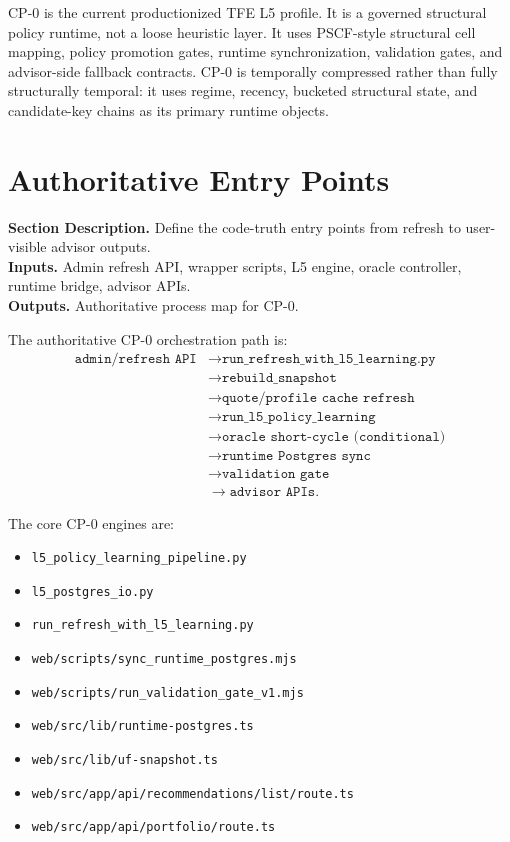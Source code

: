 \documentclass[11pt]{report}
\newcommand{\meta}[3]{\textbf{Section Description.} #1\\
\textbf{Inputs.} #2\\
\textbf{Outputs.} #3\par}
\begin{document}
CP-0 is the current productionized TFE L5 profile. It is a governed structural policy runtime, not a loose heuristic layer. It uses PSCF-style structural cell mapping, policy promotion gates, runtime synchronization, validation gates, and advisor-side fallback contracts. CP-0 is temporally compressed rather than fully structurally temporal: it uses regime, recency, bucketed structural state, and candidate-key chains as its primary runtime objects.

\section{Authoritative Entry Points}
\meta{Define the code-truth entry points from refresh to user-visible advisor outputs.}{Admin refresh API, wrapper scripts, L5 engine, oracle controller, runtime bridge, advisor APIs.}{Authoritative process map for CP-0.}

The authoritative CP-0 orchestration path is:
\begin{align*}
\texttt{admin/refresh API} &\rightarrow \texttt{run\_refresh\_with\_l5\_learning.py} \\
&\rightarrow \texttt{rebuild\_snapshot} \\
&\rightarrow \texttt{quote/profile cache refresh} \\
&\rightarrow \texttt{run\_l5\_policy\_learning} \\
&\rightarrow \texttt{oracle short-cycle (conditional)} \\
&\rightarrow \texttt{runtime Postgres sync} \\
&\rightarrow \texttt{validation gate} \\
&\rightarrow \texttt{advisor APIs}.
\end{align*}

The core CP-0 engines are:
\begin{itemize}
    \item \texttt{l5\_policy\_learning\_pipeline.py}
    \item \texttt{l5\_postgres\_io.py}
    \item \texttt{run\_refresh\_with\_l5\_learning.py}
    \item \texttt{web/scripts/sync\_runtime\_postgres.mjs}
    \item \texttt{web/scripts/run\_validation\_gate\_v1.mjs}
    \item \texttt{web/src/lib/runtime-postgres.ts}
    \item \texttt{web/src/lib/uf-snapshot.ts}
    \item \texttt{web/src/app/api/recommendations/list/route.ts}
    \item \texttt{web/src/app/api/portfolio/route.ts}
\end{itemize}
\end{document}
